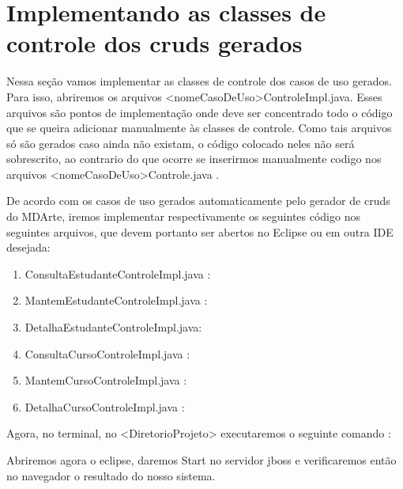 \section{Implementando as classes de controle dos cruds gerados}

Nessa seção vamos implementar as classes de controle dos casos de uso gerados. Para isso, abriremos os arquivos <nomeCasoDeUso>ControleImpl.java. Esses arquivos são pontos de implementação onde deve ser concentrado todo o código que se queira adicionar manualmente às classes de controle. Como tais arquivos só são gerados caso ainda não existam, o código colocado neles não será sobrescrito, ao contrario do que ocorre se inserirmos manualmente codigo nos arquivos <nomeCasoDeUso>Controle.java .

De acordo com os casos de uso gerados automaticamente pelo gerador de cruds do MDArte, iremos implementar respectivamente os seguintes código nos seguintes arquivos, que devem portanto ser abertos no Eclipse ou em outra IDE desejada:

\begin{enumerate}
\item ConsultaEstudanteControleImpl.java :
\begin{framed}
	
\end{framed}
		
\item MantemEstudanteControleImpl.java :
\begin{framed}
	
\end{framed}

\item DetalhaEstudanteControleImpl.java:
\begin{framed}
	
\end{framed}

\item ConsultaCursoControleImpl.java :
\begin{framed}
	
\end{framed}

\item MantemCursoControleImpl.java :
\begin{framed}
	
\end{framed}

\item DetalhaCursoControleImpl.java :
\begin{framed}
	
\end{framed}

\end{enumerate}

Agora, no terminal, no <DiretorioProjeto> executaremos o seguinte comando :

\begin{framed}
	
\end{framed}

Abriremos agora o eclipse, daremos Start no servidor jboss e verificaremos então
no navegador o resultado do nosso sistema.
